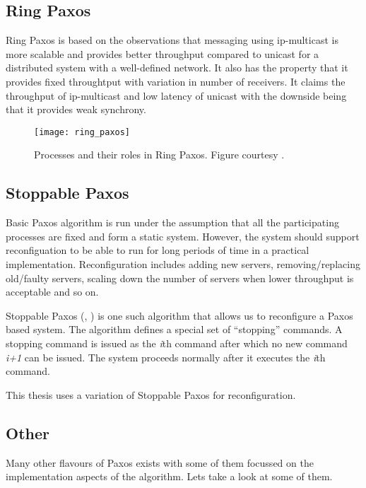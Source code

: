 \subsection{Ring Paxos}

Ring Paxos \citep{MarandiPSP10} is based on the observations that messaging
using ip-multicast is more scalable and provides better throughput compared
to unicast for a distributed system with a well-defined network. It also
has the property that it provides fixed throughtput with variation in number
of receivers. It claims the throughput of ip-multicast and low latency of
unicast with the downside being that it provides weak synchrony.

\begin{figure}
  \texttt{[image: ring\_paxos]}
  \caption[Ring Paxos]{%
  Processes and their roles in Ring Paxos. Figure courtesy 
  \citep{MarandiPSP10}.}
  \label{figure:ring.paxos}
\end{figure}

\subsection{Stoppable Paxos}

Basic Paxos algorithm is run under the assumption that all the participating
processes are fixed and form a static system. However, the system should
support reconfiguation to be able to run for long periods of time in a
practical implementation. Reconfiguration includes adding new servers, 
removing/replacing old/faulty servers, scaling down the number of servers
when lower throughput is acceptable and so on.

Stoppable Paxos (\citet{LamportSP08}, \citet{LamportMZ10}) is one such algorithm
that allows us to reconfigure a Paxos based system. The algorithm defines a
special set of ``stopping'' commands. A stopping command is issued as the
\emph{i}th command after which no new command \emph{i+1} can be issued. The 
system proceeds normally after it executes the \emph{i}th command.

This thesis uses a variation of Stoppable Paxos for reconfiguration.

\subsection{Other}

Many other flavours of Paxos exists with some of them focussed on the 
implementation aspects of the algorithm. Lets take a look at some of them.

